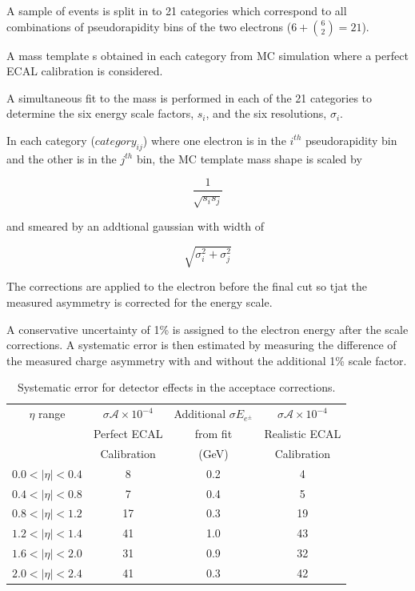 A sample of \Zee events is  split in to 21 categories which correspond to all
combinations of pseudorapidity bins of the two electrons ($6+\binom{6}{2} = 21$).

A mass template s obtained in each category from \ac{MC} simulation where a
perfect \ac{ECAL} calibration is considered.

A simultaneous fit to the \Zee mass is performed in each of the 21 categories
to determine the six energy scale factors, $s_i$, and the six resolutions, 
$\sigma_i$.

In each category ($category_{ij}$) where one electron is in the $i^{th}$
pseudorapidity bin and the other is in the $j^{th}$ bin, the \ac{MC} template
mass shape is scaled by 

\begin{equation}
    \frac{1}{\sqrt{s_i s_j} } 
\end{equation}

and smeared by an addtional gaussian with width of 

\begin{equation}
    \sqrt{\sigma_i^2+\sigma_j^2}
\end{equation}


The corrections are applied to the electron before the final \Pt cut so tjat
the measured asymmetry is corrected for the energy scale.

A conservative uncertainty of \unit{1}{\% } is assigned to the electron energy
after the scale corrections. A systematic error is then estimated by measuring
the difference of the measured charge asymmetry with and without the additional
\unit{1}{\% } scale factor.

\begin{table}[htb]
  \begin{center}
    \begin{tabular}{cccc}
$\eta$ range& $\sigma{\mathcal{A}} \times 10^{-4}$  & Additional $\sigma{E_{e^\pm}}$  & $\sigma{\mathcal{A}} \times 10^{-4}$ \\
& Perfect ECAL  & from fit  &  Realistic ECAL\\
& Calibration & (GeV) & Calibration \\
\hline
$0.0<| \eta |<0.4$  &  8  & 0.2  &  4 \\
$0.4<| \eta |<0.8$  &  7  & 0.4  &  5\\
$0.8<| \eta |<1.2$  & 17  & 0.3  & 19\\
$1.2<| \eta |<1.4$  & 41  & 1.0  & 43\\
$1.6<| \eta |<2.0$  & 31  & 0.9  & 32 \\
$2.0<| \eta |<2.4$  & 41  & 0.3  & 42\\
    \end{tabular}
    \caption{\label{tab:acc}Systematic error for detector effects in the acceptace corrections.}
  \end{center}
\end{table}

